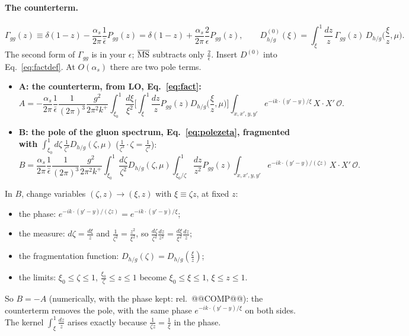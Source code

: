 \documentclass[10pt]{article}
\numberwithin{equation}{section}
\newcommand{\OO}{\mathcal O}
\newcommand{\pre}{\frac{1}{(2\pi)^3}\frac{g^2}{2\pi^2k^+}}
\begin{document}
\paragraph{The counterterm.}
\begin{equation}
\boxed{\Gamma_{gg}(z)\equiv\delta(1-z)-\frac{\alpha_s}{2\pi}\frac{1}{\bar\epsilon}P_{gg}(z)=\delta(1-z)+\frac{\alpha_s}{2\pi}\frac{2}{\epsilon}P_{gg}(z),\qquad
D^{(0)}_{h/g}(\xi)=\int_\xi^1\frac{dz}{z}\,\Gamma_{gg}(z)\,D_{h/g}\Big(\frac{\xi}{z},\mu\Big).}
\label{eq:Gamma}
\end{equation}
The second form of $\Gamma_{gg}$ is in your $\epsilon$; $\overline{\rm MS}$ subtracts only $\frac{2}{\epsilon}$. Insert $D^{(0)}$ into Eq.~\eqref{eq:factdef}. At $O(\alpha_s)$ there are two pole terms.
\begin{itemize}
\item \textbf{A: the counterterm, from LO, Eq.~\eqref{eq:fact}:}
\begin{equation*}
A=-\frac{\alpha_s}{2\pi}\frac{1}{\bar\epsilon}\pre\int_{\xi_0}^1\frac{d\xi}{\xi^2}\Big[\int_\xi^1\frac{dz}{z}P_{gg}(z)D_{h/g}\Big(\frac{\xi}{z},\mu\Big)\Big]\int_{x,x',y,y'}e^{-ik\cdot(y'-y)/\xi}\,X\cdot X'\,\OO .
\end{equation*}
\item \textbf{B: the pole of the gluon spectrum, Eq.~\eqref{eq:polezeta}, fragmented with $\int_{\xi_0}^1d\zeta\,\frac{1}{\zeta^3}D_{h/g}(\zeta,\mu)$} ($\frac{1}{\zeta^3}\cdot\zeta=\frac{1}{\zeta^2}$):
\begin{equation*}
B=\frac{\alpha_s}{2\pi}\frac{1}{\bar\epsilon}\pre\int_{\xi_0}^1\frac{d\zeta}{\zeta^2}D_{h/g}(\zeta,\mu)\int_{\xi_0/\zeta}^1\frac{dz}{z^2}P_{gg}(z)\int_{x,x',y,y'}e^{-ik\cdot(y'-y)/(\zeta z)}\,X\cdot X'\,\OO .
\end{equation*}
\end{itemize}
In $B$, change variables $(\zeta,z)\to(\xi,z)$ with $\xi\equiv\zeta z$, at fixed $z$:
\begin{itemize}
\item the phase: $e^{-ik\cdot(y'-y)/(\zeta z)}=e^{-ik\cdot(y'-y)/\xi}$;
\item the measure: $d\zeta=\frac{d\xi}{z}$ and $\frac{1}{\zeta^2}=\frac{z^2}{\xi^2}$, so $\frac{d\zeta}{\zeta^2}\frac{dz}{z^2}=\frac{d\xi}{\xi^2}\frac{dz}{z}$;
\item the fragmentation function: $D_{h/g}(\zeta)=D_{h/g}(\frac{\xi}{z})$;
\item the limits: $\xi_0\le\zeta\le1$, $\frac{\xi_0}{\zeta}\le z\le1$ become $\xi_0\le\xi\le1$, $\xi\le z\le1$.
\end{itemize}
So $B=-A$ (numerically, with the phase kept: rel.\ @@COMP@@): the counterterm removes the pole, with the same phase $e^{-ik\cdot(y'-y)/\xi}$ on both sides. The kernel $\int_\xi^1\frac{dz}{z}$ arises exactly because $\frac{1}{\zeta z}=\frac1\xi$ in the phase.
\end{document}

